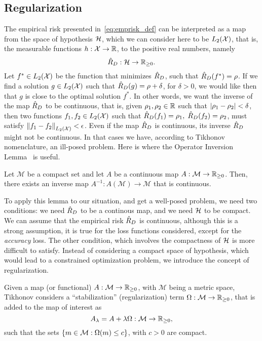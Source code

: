 \subsection{Regularization}
The empirical risk presented in~\eqref{eq:emprisk_def} can be interpreted as a map from the space of hypothesis $\mathcal{H}$, which we can consider here to be $L_2(\mathcal{X})$, that is, the measurable functions $h: \mathcal{X} \to \mathbb{R}$, to the positive real numbers, namely
$$ \hat{R}_D: \mathcal{H} \to \mathbb{R}_{\geq 0} .$$
%
Let $f^* \in L_2(\mathcal{X})$ be the function that minimizes $\hat{R}_D$, such that $\hat{R}_D(f^*) = \rho$. If we find a solution $g \in L_2(\mathcal{X})$ such that $\hat{R}_D(g) = \rho + \delta$, for $\delta > 0$, we would like then that $g$ is close to the optimal solution $f^*$.
%
In other words, we want the inverse of the map $\hat{R}_D$ to be continuous, that is, given $\rho_1, \rho_2 \in \mathbb{R}$ such that $\left|\rho_1 - \rho_2\right| < \delta$, then two functions $f_1, f_2 \in L_2(\mathcal{X})$ such that $\hat{R}_D(f_1) = \rho_1, \; \hat{R}_D(f_2) = \rho_2$, must satisfy $\left\lVert f_1 - f_2\right\rVert_{L_2(\mathcal{X})} < \epsilon$.
%
Even if the map $\hat{R}_D$ is continuous, its inverse $\hat{R}_D$ might not be continuous. In that cases we have, according to Tikhonov nomenclature, an ill-posed problem.
%
Here is where the Operator Inversion Lemma~\citep{riesz2012functional} is useful.
\begin{lemma}
    Let $\mathcal{M}$ be a compact set and let $A$ be a continuous map $A: \mathcal{M} \to \mathbb{R}_{\geq 0}$. Then, there exists an inverse map $A^{-1}: A(\mathcal{M}) \to \mathcal{M}$ that is continuous.
\end{lemma}
%
To apply this lemma to our situation, and get a well-posed problem, we need two conditions: we need $\hat{R}_D$ to be a continous map, and we need $\mathcal{H}$ to be compact.
%
We can assume that the empirical risk $\hat{R}_D$ is continuous, although this is a strong assumption, it is true for the loss functions considered, except for the \emph{accuracy} loss.
%
The other condition, which involves the compactness of $\mathcal{H}$ is more difficult to satisfy. Instead of considering a compact space of hypothesis, which would lead to a constrained optimization problem, we introduce the concept of regularization.

%
Given a map (or functional) $A: \mathcal{M} \to \mathbb{R}_{\geq 0}$, with $\mathcal{M}$ being a metric space,
Tikhonov considers a ``stabilization'' (regularization) term $\Omega: \mathcal{M} \to \mathbb{R}_{\geq 0}$, that is added to the map of interest as 
\begin{equation}
    \nonumber
    A_\lambda = A + \lambda \Omega: \mathcal{M} \to \mathbb{R}_{\geq 0} ,
\end{equation}
such that the sets $\left\{m \in \mathcal{M}: \Omega(m) \leq c\right\}$, with $c > 0$ are compact.

